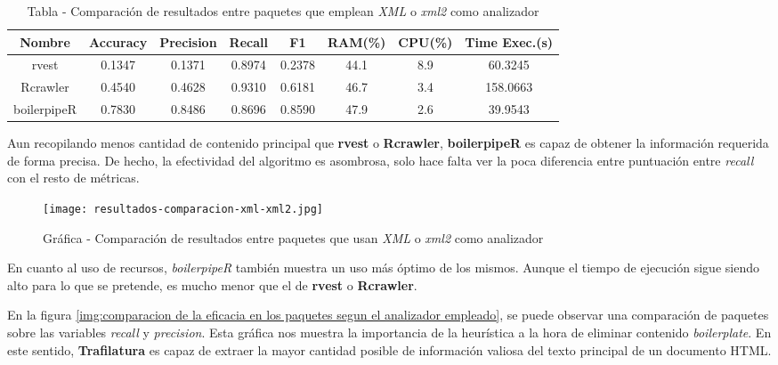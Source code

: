 \begin{table}[h]
    \begin{center}
      \begin{tabular}{| c | c | c | c | c | c | c | c |} \hline 
       \textbf{Nombre} & \textbf{Accuracy} & \textbf{Precision}  & \textbf{Recall} & \textbf{F1} & \textbf{RAM(\%)} & \textbf{CPU(\%)} & \textbf{Time Exec.(s)} \\ \hline
       rvest & 0.1347 & 0.1371 & 0.8974 & 0.2378 & 44.1 & 8.9 & 60.3245 \\ \hline
       Rcrawler & 0.4540 & 0.4628 & 0.9310 & 0.6181 & 46.7 & 3.4 & 158.0663 \\ \hline
       boilerpipeR & 0.7830 & 0.8486 & 0.8696 & 0.8590 & 47.9 & 2.6 & 39.9543 \\ \hline
      \end{tabular}
      \caption{Tabla - Comparación de resultados entre paquetes que emplean \emph{XML} o \emph{xml2} como analizador}
      \label{tab:tabla - comparacion de resultados entre paquetes que emplean xml o xml2 como analizador}
    \end{center}
\end{table}

Aun recopilando menos cantidad de contenido principal que \textbf{rvest} o \textbf{Rcrawler}, 
\textbf{boilerpipeR} es capaz de obtener la información requerida de forma precisa. De hecho, la efectividad 
del algoritmo es asombrosa, solo hace falta ver la poca diferencia entre puntuación entre \emph{recall} 
con el resto de métricas.

\begin{figure}[tphb]
    \centering
    \texttt{[image: resultados-comparacion-xml-xml2.jpg]}
    \caption{Gráfica - Comparación de resultados entre paquetes que usan \emph{XML} o \emph{xml2} como analizador}
    \label{img:grafica - comparacion de resultados entre paquetes que usan xml o xml2 como analizador}
\end{figure}

En cuanto al uso de recursos, \emph{boilerpipeR} también muestra un uso más óptimo de los mismos. Aunque 
el tiempo de ejecución sigue siendo alto para lo que se pretende, es mucho menor que el de \textbf{rvest} 
o \textbf{Rcrawler}.

En la figura \ref{img:comparacion de la eficacia en los paquetes segun el analizador empleado}, se puede
observar una comparación de paquetes sobre las variables \emph{recall} y \emph{precision}. Esta gráfica
nos muestra la importancia de la heurística a la hora de eliminar contenido \emph{boilerplate}. En este
sentido, \textbf{Trafilatura} es capaz de extraer la mayor cantidad posible de información valiosa del 
texto principal de un documento HTML.

